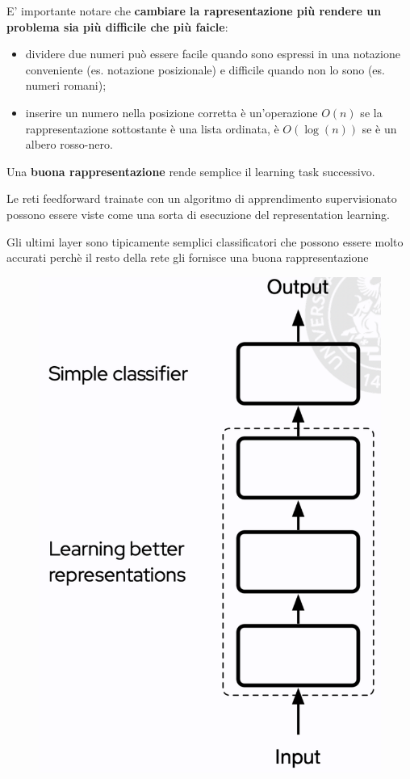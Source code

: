 E' importante notare che \textbf{cambiare la rapresentazione più rendere un problema sia più difficile che
più faicle}:
\begin{itemize}
  \item dividere due numeri può essere facile quando sono espressi in una notazione conveniente (es. notazione
  posizionale) e difficile quando non lo sono (es. numeri romani);
  \item inserire un numero nella posizione corretta è un'operazione $O(n)$ se la rappresentazione sottostante
  è una lista ordinata, è $O(\log{(n)})$ se è un albero rosso-nero.
\end{itemize}
\newpage
Una \textbf{buona rappresentazione} rende semplice il learning task successivo.


Le reti feedforward trainate con un algoritmo di apprendimento supervisionato possono essere viste come 
una sorta di esecuzione del representation learning.


Gli ultimi layer sono tipicamente semplici classificatori che possono essere molto accurati perchè il resto
della rete gli fornisce una buona rappresentazione
\begin{figure}[!h]
  \includegraphics[scale=.5]{images/representation_learning/difficulty.png}
  \centering
\end{figure}
\newpage
